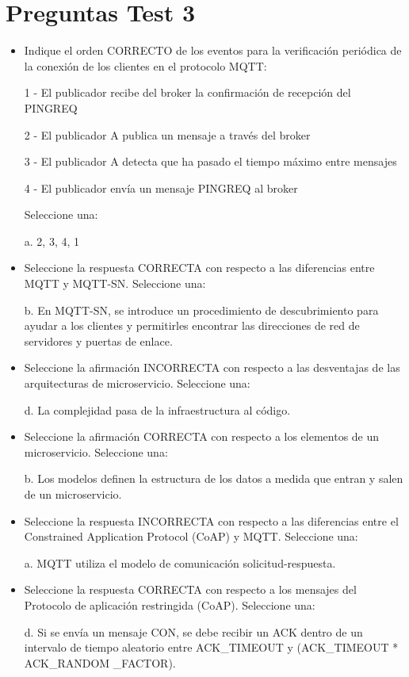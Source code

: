 \documentclass[12pt]{report} %
\begin{document}
\section{Preguntas Test 3}
\begin{itemize}
	\item Indique el orden CORRECTO de los eventos para la verificación periódica de la conexión de los clientes en el protocolo MQTT:
	
	1 - El publicador recibe del broker la confirmación de recepción del PINGREQ

	2 - El publicador A publica un mensaje a través del broker

	3 - El publicador A detecta que ha pasado el tiempo máximo entre mensajes

	4 - El publicador envía un mensaje PINGREQ al broker

	Seleccione una:

	a. 2, 3, 4, 1 

	\item Seleccione la respuesta CORRECTA con respecto a las diferencias entre MQTT y MQTT-SN. Seleccione una:

	b. En MQTT-SN, se introduce un procedimiento de descubrimiento para ayudar a los clientes y permitirles encontrar las direcciones de red de servidores y puertas de enlace. 

	\item Seleccione la afirmación INCORRECTA con respecto a las desventajas de las arquitecturas de microservicio. Seleccione una:

	d. La complejidad pasa de la infraestructura al código. 

	\item Seleccione la afirmación CORRECTA con respecto a los elementos de un microservicio. Seleccione una:

	b. Los modelos definen la estructura de los datos a medida que entran y salen de un microservicio. 

	\item Seleccione la respuesta INCORRECTA con respecto a las diferencias entre el Constrained Application Protocol (CoAP) y MQTT.
	Seleccione una:

	a. MQTT utiliza el modelo de comunicación solicitud-respuesta. 

	\item Seleccione la respuesta CORRECTA con respecto a los mensajes del Protocolo de aplicación restringida (CoAP). Seleccione una:

	d. Si se envía un mensaje CON, se debe recibir un ACK dentro de un intervalo de tiempo aleatorio entre ACK\_TIMEOUT y (ACK\_TIMEOUT * ACK\_RANDOM \_FACTOR). 


\end{itemize}
\end{document}
